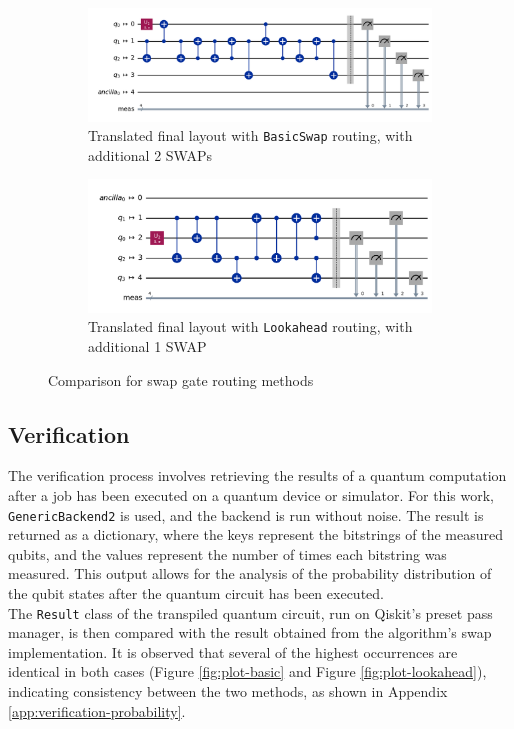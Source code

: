 \begin{figure}[htb]
    \centering
    \begin{subfigure}{0.8\linewidth}
        \includegraphics[width=\linewidth]{image/final_trivial_basic.png}
        \caption{Translated final layout with \lstinline{BasicSwap} routing, with additional 2 SWAPs}
        \label{fig:routing-basic-swap}
    \end{subfigure}
    \begin{subfigure}{0.8\linewidth}
        \includegraphics[width=\linewidth]{image/final_lookahead.png}
        \caption{Translated final layout with \lstinline{Lookahead} routing, with additional 1 SWAP}
        \label{fig:routing-lookahead}
    \end{subfigure}
    \caption{Comparison for swap gate routing methods}
\end{figure}

\subsection{Verification} %
The verification process involves retrieving the results of a quantum computation after a job has been executed on a quantum device or simulator. For this work, \lstinline{GenericBackend2} \cite{ibmquantum_genericbackendv2} is used, and the backend is run without noise. The result is returned as a dictionary, where the keys represent the bitstrings of the measured qubits, and the values represent the number of times each bitstring was measured. This output allows for the analysis of the probability distribution of the qubit states after the quantum circuit has been executed. \\
The \lstinline{Result} class \cite{ibmquantum_result} of the transpiled quantum circuit, run on Qiskit's preset pass manager, is then compared with the result obtained from the algorithm's swap implementation. It is observed that several of the highest occurrences are identical in both cases (Figure \ref{fig:plot-basic} and Figure \ref{fig:plot-lookahead}), indicating consistency between the two methods, as shown in Appendix \ref{app:verification-probability}.